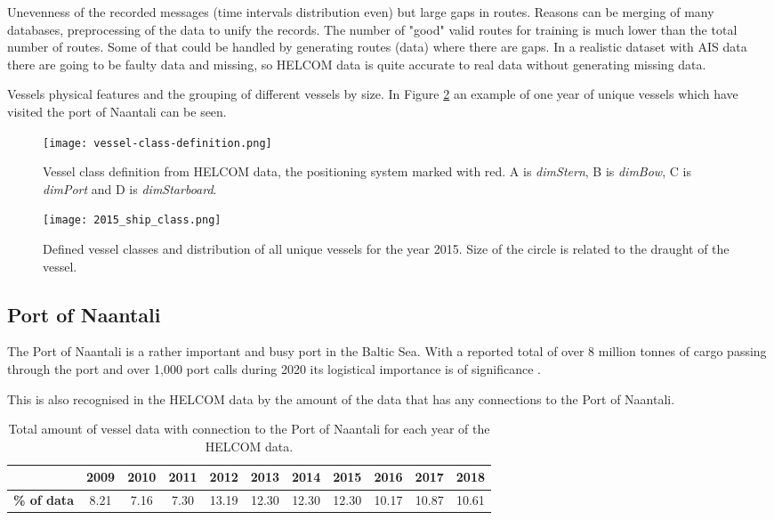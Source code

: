 \documentclass[../main.tex]{subfiles}
\begin{document}
Unevenness of the recorded messages (time intervals distribution even) but large gaps in routes. Reasons can be merging of many databases, preprocessing of the data to unify the records. The number of "good" valid routes for training is much lower than the total number of routes. Some of that could be handled by generating routes (data) where there are gaps. In a realistic dataset with AIS data there are going to be faulty data and missing, so HELCOM data is quite accurate to real data without generating missing data.



Vessels physical features and the grouping of different vessels by size. In Figure \ref{fig:vessel-classes} an example of one year of unique vessels which have visited the port of Naantali can be seen. 

\begin{figure}[H]
\centering
\texttt{[image: vessel-class-definition.png]}
\caption{Vessel class definition from HELCOM data, the positioning system marked with red. A is \textit{dimStern}, B is \textit{dimBow}, C is \textit{dimPort} and D is \textit{dimStarboard}.}
\label{fig:vessel-class-def}
\end{figure}

\begin{figure}[H]
\centering
\texttt{[image: 2015\_ship\_class.png]}
\caption{Defined vessel classes and distribution of all unique vessels for the year 2015. Size of the circle is related to the draught of the vessel.}
\label{fig:vessel-classes}
\end{figure}


\subsection{Port of Naantali}

The Port of Naantali is a rather important and busy port in the Baltic Sea. With a reported total of over 8 million tonnes of cargo passing through the port and over 1,000 port calls during 2020 its logistical importance is of significance \cite{PoN_2021}. 

This is also recognised in the HELCOM data by the amount of the data that has any connections to the Port of Naantali.

\begin{table}[H]
\centering
\begin{tabular}{|l|c|c|c|c|c|c|c|c|c|c|}
\hline
\rowcolor[HTML]{C0C0C0} 
\multicolumn{1}{|r|}{\cellcolor[HTML]{C0C0C0}\textbf{Year}} & \textbf{2009} & \textbf{2010} & \textbf{2011} & \textbf{2012} & \textbf{2013} & \textbf{2014} & \textbf{2015} & \textbf{2016} & \textbf{2017} & \textbf{2018} \\ \hline
\textbf{\% of data}                           & 8.21          & 7.16          & 7.30          & 13.19         & 12.30         & 12.30         & 12.30         & 10.17         & 10.87         & 10.61         \\ \hline
\end{tabular}
\caption{Total amount of vessel data with connection to the Port of Naantali for each year of the HELCOM data.}
\label{tab:HELCOM-data-percent}
\end{table}
\end{document}
